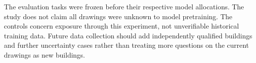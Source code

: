 The evaluation tasks were frozen before their respective model allocations. The study does not claim all drawings were unknown to model pretraining. The controls concern exposure through this experiment, not unverifiable historical training data. Future data collection should add independently qualified buildings and further uncertainty cases rather than treating more questions on the current drawings as new buildings.
